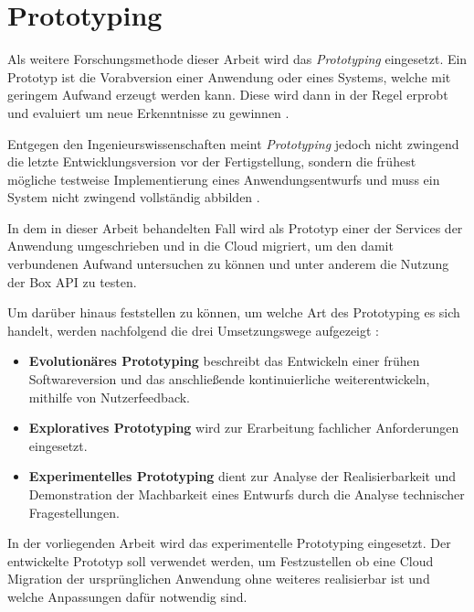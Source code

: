 \section{Prototyping}

Als weitere Forschungsmethode dieser Arbeit wird das \textit{Prototyping} eingesetzt. Ein Prototyp ist die Vorabversion einer Anwendung oder eines Systems, welche mit geringem Aufwand erzeugt werden kann. Diese wird dann in der Regel erprobt und evaluiert um neue Erkenntnisse zu gewinnen \cite[Vgl.][S. 282]{Wilde2007}\cite[Vgl.][S. 114]{Heinrich2011}.

Entgegen den Ingenieurswissenschaften meint \textit{Prototyping} jedoch nicht zwingend die letzte Entwicklungsversion vor der Fertigstellung, sondern die frühest mögliche testweise Implementierung eines Anwendungsentwurfs \cite[Vgl.][S. 114]{Heinrich2011} und muss ein System nicht zwingend vollständig abbilden \cite[Vgl.][S. 119]{Heinrich2011}.

In dem in dieser Arbeit behandelten Fall wird als Prototyp einer der Services der Anwendung umgeschrieben und in die Cloud migriert, um den damit verbundenen Aufwand untersuchen zu können und unter anderem die Nutzung der \gls{Box} \ac{API} zu testen. \pagebreak

Um darüber hinaus feststellen zu können, um welche Art des Prototyping es sich handelt, werden nachfolgend die drei Umsetzungswege aufgezeigt \cite[Vgl. auch im Folgenden][S. 370]{Alpar2019}:
\begin{itemize}
    \item \textbf{Evolutionäres Prototyping} beschreibt das Entwickeln einer frühen Softwareversion und das anschließende kontinuierliche weiterentwickeln, mithilfe von Nutzerfeedback.
    \item \textbf{Exploratives Prototyping} wird zur Erarbeitung fachlicher Anforderungen eingesetzt.
    \item \textbf{Experimentelles Prototyping} dient zur Analyse der Realisierbarkeit und Demonstration der Machbarkeit eines Entwurfs durch die Analyse technischer Fragestellungen.
\end{itemize}

In der vorliegenden Arbeit wird das experimentelle Prototyping eingesetzt. Der entwickelte Prototyp soll verwendet werden, um Festzustellen ob eine Cloud Migration der ursprünglichen Anwendung ohne weiteres realisierbar ist und welche Anpassungen dafür notwendig sind. \pagebreak